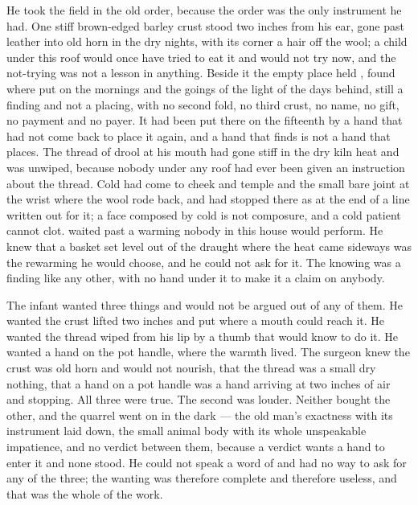 He took the field in the old order, because the order was the only instrument he had. One stiff brown-edged barley crust stood two inches from his ear, gone past leather into old horn in the dry nights, with its corner a hair off the wool; a child under this roof would once have tried to eat it and would not try now, and the not-trying was not a lesson in anything. Beside it the empty place held , found where put on the mornings and the goings of the light of the days behind, still a finding and not a placing, with no second fold, no third crust, no name, no gift, no payment and no payer. It had been put there on the fifteenth by a hand that had not come back to place it again, and a hand that finds is not a hand that places. The thread of drool at his mouth had gone stiff in the dry kiln heat and was unwiped, because nobody under any roof had ever been given an instruction about the thread. Cold had come to cheek and temple and the small bare joint at the wrist where the wool rode back, and had stopped there as at the end of a line written out for it; a face composed by cold is not composure, and a cold patient cannot clot.  waited past a warming nobody in this house would perform. He knew that a basket set level out of the draught where the heat came sideways was the rewarming he would choose, and he could not ask for it. The knowing was a finding like any other, with no hand under it to make it a claim on anybody.

The infant wanted three things and would not be argued out of any of them. He wanted the crust lifted two inches and put where a mouth could reach it. He wanted the thread wiped from his lip by a thumb that would know to do it. He wanted a hand on the pot handle, where the warmth lived. The surgeon knew the crust was old horn and would not nourish, that the thread was a small dry nothing, that a hand on a pot handle was a hand arriving at two inches of air and stopping. All three were true. The second was louder. Neither bought the other, and the quarrel went on in the dark --- the old man's exactness with its instrument laid down, the small animal body with its whole unspeakable impatience, and no verdict between them, because a verdict wants a hand to enter it and none stood. He could not speak a word of  and had no way to ask for any of the three; the wanting was therefore complete and therefore useless, and that was the whole of the work.

